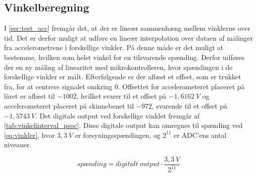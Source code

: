 \subsection{Vinkelberegning}\label{sec:imp_vinkler}
I \autoref{sec:test_acc} fremgår det, at der er lineær sammenhæng mellem vinklerne over tid. Det er derfor muligt at udføre en lineær interpolation over dataen af målinger fra accelerometrene i forskellige vinkler. På denne måde er det muligt at bestemme, hvilken som helst vinkel for en tilsvarende spænding. 
Derfor udføres der en ny måling af linearitet med mikrokontrolleren, hvor spændingen i de forskellige vinkler er målt. Efterfølgende er der aflæst et offset, som er trukket fra, for at centrere signalet omkring 0. Offsettet for accelerometeret placeret på låret er aflæst til $-1002$, hvilket svarer til et offset på $-1,6162~V$ og accelerometeret placeret på skinnebenet til $-972$, svarende til et offset på $-1,5743~V$. Det digitale output ved forskellige vinklet fremgår af \autoref{tab:vinkelinterval_psoc}. Disse digitale output kan omregnes til spænding ved \autoref{eq:vinkler}, hvor $3,3~V$ er forsyningsspændingen, og $2^{11}$ er ADC'ens antal niveauer.  

\begin{equation}
\label{eq:vinkler}
sp\text{æ}nding =digitalt~output\cdot \dfrac{3,3~V}{2^{11}}
\end{equation}

